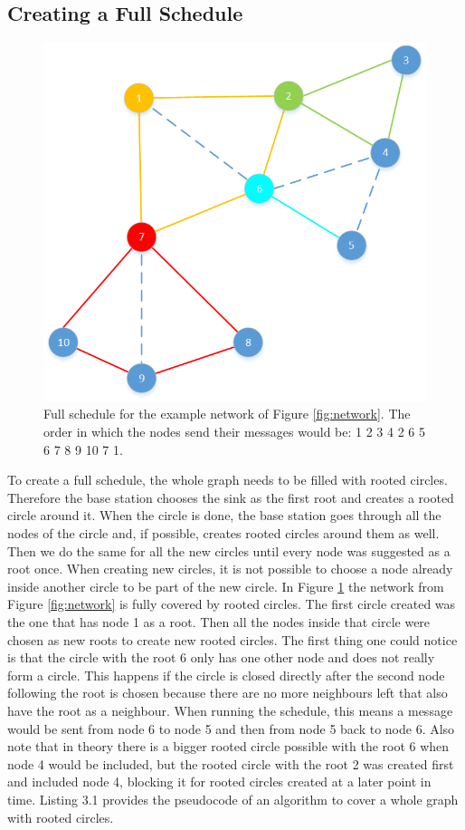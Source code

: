 \subsection{Creating a Full Schedule}
\begin{figure}[htbp]
	\centering         
    \includegraphics[scale=0.6]{content/images/Schedule/FullSchedule}
    \caption{Full schedule for the example network of Figure \ref{fig:network}. The order in which the nodes send their messages would be: 1 2 3 4 2 6 5 6 7 8 9 10 7 1.}
    \label{fig:schedule}
\end{figure} 
To create a full schedule, the whole graph needs to be filled with rooted circles. Therefore the base station chooses the sink as the first root and creates a rooted circle around it. When the circle is done, the base station goes through all the nodes of the circle and, if possible, creates rooted circles around them as well. Then we do the same for all the new circles until every node was suggested as a root once. When creating new circles, it is not possible to choose a node already inside another circle to be part of the new circle. In Figure \ref{fig:schedule} the network from Figure \ref{fig:network} is fully covered by rooted circles. The first circle created was the one that has node 1 as a root. Then all the nodes inside that circle were chosen as new roots to create new rooted circles. The first thing one could notice is that the circle with the root 6 only has one other node and does not really form a circle. This happens if the circle is closed directly after the second node following the root is chosen because there are no more neighbours left that also have the root as a neighbour. When running the schedule, this means a message would be sent from node 6 to node 5 and then from node 5 back to node 6. Also note that in theory there is a bigger rooted circle possible with the root 6 when node 4 would be included, but the rooted circle with the root 2 was created first and included node 4, blocking it for rooted circles created at a later point in time. Listing 3.1 provides the pseudocode of an algorithm to cover a whole graph with rooted circles.

